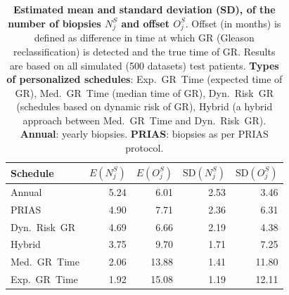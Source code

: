 \begin{table}
\small
\centering
\caption{\textbf{Estimated mean and standard deviation (SD), of the number of biopsies $N^S_j$ and offset $O^S_j$}. Offset (in months) is defined as difference in time at which GR (Gleason reclassification) is detected and the true time of GR. Results are based on all simulated (500 datasets) test patients. \textbf{Types of personalized schedules}: Exp.~GR~Time (expected time of GR), Med.~GR~Time (median time of GR), Dyn.~Risk~GR (schedules based on dynamic risk of GR), Hybrid (a hybrid approach between Med.~GR~Time and Dyn.~Risk~GR). \textbf{Annual}: yearly biopsies. \textbf{PRIAS}: biopsies as per PRIAS protocol.}
\label{c2:table:sim_study_pooled_estimates_all}
\begin{tabular}{lrrrr}
\toprule
Schedule          & $E(N^S_j)$ & $E(O^S_j)$ & ${\mbox{SD}(N^S_j)}$ & ${\mbox{SD}(O^S_j)}$ \\
\midrule
Annual         & 5.24            & 6.01                & 2.53          & 3.46              \\
PRIAS          & 4.90            & 7.71                & 2.36          & 6.31\\
Dyn.~Risk~GR       & 4.69            & 6.66                & 2.19           & 4.38              \\
Hybrid       & 3.75            & 9.70                & 1.71          & 7.25              \\
Med.~GR~Time & 2.06            & 13.88               & 1.41          & 11.80              \\
Exp.~GR~Time & 1.92            & 15.08               & 1.19          & 12.11             \\
\bottomrule
\end{tabular}
\end{table}

